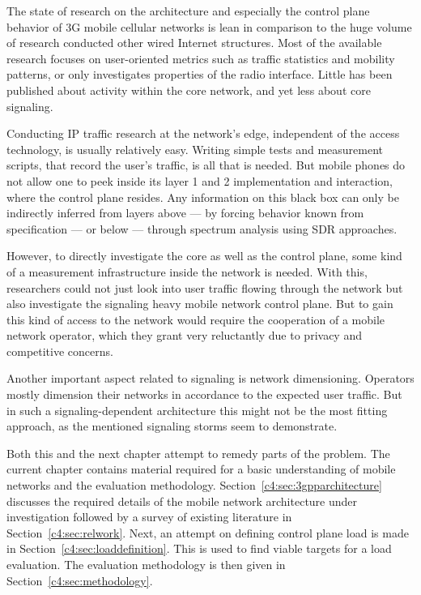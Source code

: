 The state of research on the architecture and especially the control plane behavior of \gls{3G} mobile cellular networks is lean in comparison to the huge volume of research conducted other wired Internet structures. Most of the available research focuses on user-oriented metrics such as traffic statistics and mobility patterns, or only investigates properties of the radio interface. Little has been published about activity within the core network, and yet less about core signaling. 

Conducting \gls{IP} traffic research at the network's edge, independent of the access technology, is usually relatively easy. Writing simple tests and measurement scripts, that record the user's traffic, is all that is needed. But mobile phones do not allow one to peek inside its layer 1 and 2 implementation and interaction, where the control plane resides. Any information on this black box can only be indirectly inferred from layers above --- by forcing behavior known from specification --- or below --- through spectrum analysis using \gls{SDR} approaches. 

However, to directly investigate the core as well as the control plane, some kind of a measurement infrastructure inside the network is needed. With this, researchers could not just look into user traffic flowing through the network but also investigate the signaling heavy mobile network control plane. But to gain this kind of access to the network  would require the cooperation of a mobile network operator, which they grant very reluctantly due to privacy and competitive concerns.

Another important aspect related to signaling is network dimensioning. Operators mostly dimension their networks in accordance to the expected user traffic. But in such a signaling-dependent architecture this might not be the most fitting approach, as the mentioned signaling storms seem to demonstrate. 

Both this and the next chapter attempt to remedy parts of the problem. The current chapter contains material required for a basic understanding of mobile networks and the evaluation methodology. Section~\ref{c4:sec:3gpparchitecture} discusses the required details of the mobile network architecture under investigation followed by a survey of existing literature in Section~\ref{c4:sec:relwork}. Next, an attempt on defining control plane load is made in Section~\ref{c4:sec:loaddefinition}. This is used to find viable targets for a load evaluation. The evaluation methodology is then given in Section~\ref{c4:sec:methodology}.

